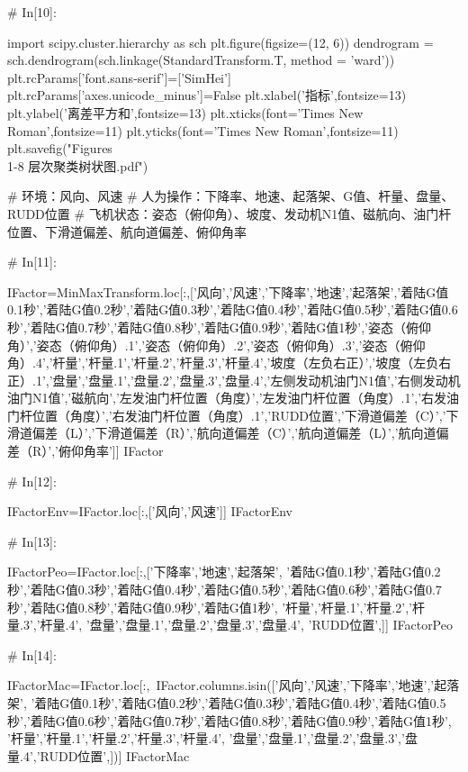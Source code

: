 \documentclass{MathorCupModeling}
\begin{document}
\begin{python}
# In[10]:


import scipy.cluster.hierarchy as sch
plt.figure(figsize=(12, 6))
dendrogram = sch.dendrogram(sch.linkage(StandardTransform.T, method = 'ward'))
plt.rcParams['font.sans-serif']=['SimHei']
plt.rcParams['axes.unicode_minus']=False
plt.xlabel('指标',fontsize=13)
plt.ylabel('离差平方和',fontsize=13)
plt.xticks(font='Times New Roman',fontsize=11)
plt.yticks(font='Times New Roman',fontsize=11)
plt.savefig("Figures\\1-8 层次聚类树状图.pdf")


# 环境：风向、风速
# 人为操作：下降率、地速、起落架、G值、杆量、盘量、RUDD位置
# 飞机状态：姿态（俯仰角）、坡度、发动机N1值、磁航向、油门杆位置、下滑道偏差、航向道偏差、俯仰角率

# In[11]:


IFactor=MinMaxTransform.loc[:,['风向','风速','下降率','地速','起落架','着陆G值0.1秒','着陆G值0.2秒','着陆G值0.3秒','着陆G值0.4秒','着陆G值0.5秒','着陆G值0.6秒','着陆G值0.7秒','着陆G值0.8秒','着陆G值0.9秒','着陆G值1秒','姿态（俯仰角）','姿态（俯仰角）.1','姿态（俯仰角）.2','姿态（俯仰角）.3','姿态（俯仰角）.4','杆量','杆量.1','杆量.2','杆量.3','杆量.4','坡度（左负右正）','坡度（左负右正）.1','盘量','盘量.1','盘量.2','盘量.3','盘量.4','左侧发动机油门N1值','右侧发动机油门N1值','磁航向','左发油门杆位置（角度）','左发油门杆位置（角度）.1','右发油门杆位置（角度）','右发油门杆位置（角度）.1','RUDD位置','下滑道偏差（C）','下滑道偏差（L）','下滑道偏差（R）','航向道偏差（C）','航向道偏差（L）','航向道偏差（R）','俯仰角率']]
IFactor


# In[12]:


IFactorEnv=IFactor.loc[:,['风向','风速']]
IFactorEnv


# In[13]:


IFactorPeo=IFactor.loc[:,['下降率','地速','起落架',
                          '着陆G值0.1秒','着陆G值0.2秒','着陆G值0.3秒','着陆G值0.4秒','着陆G值0.5秒','着陆G值0.6秒','着陆G值0.7秒','着陆G值0.8秒','着陆G值0.9秒','着陆G值1秒',
                          '杆量','杆量.1','杆量.2','杆量.3','杆量.4',
                          '盘量','盘量.1','盘量.2','盘量.3','盘量.4',
                          'RUDD位置',]]
IFactorPeo


# In[14]:


IFactorMac=IFactor.loc[:,~IFactor.columns.isin(['风向','风速','下降率','地速','起落架',
                          '着陆G值0.1秒','着陆G值0.2秒','着陆G值0.3秒','着陆G值0.4秒','着陆G值0.5秒','着陆G值0.6秒','着陆G值0.7秒','着陆G值0.8秒','着陆G值0.9秒','着陆G值1秒',
                          '杆量','杆量.1','杆量.2','杆量.3','杆量.4',
                          '盘量','盘量.1','盘量.2','盘量.3','盘量.4','RUDD位置',])]
IFactorMac



\end{python}
\end{document}
